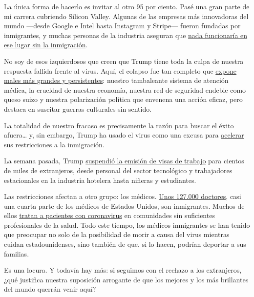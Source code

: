 La única forma de hacerlo es invitar al otro 95 por ciento. Pasé una
gran parte de mi carrera cubriendo Silicon Valley. Algunas de las
empresas más innovadoras del mundo ---desde Google e Intel hasta
Instagram y Stripe--- fueron fundadas por inmigrantes, y muchas personas
de la industria aseguran que
\href{https://www.nytimes.com/es/2017/02/23/espanol/por-que-silicon-valley-no-funcionaria-sin-inmigrantes.html}{nada
funcionaría en ese lugar sin la inmigración}.

No soy de esos izquierdosos que creen que Trump tiene toda la culpa de
nuestra respuesta fallida frente al virus. Aquí, el colapso fue tan
completo que
\href{https://www.theatlantic.com/magazine/archive/2020/06/underlying-conditions/610261/}{expone
males más grandes y persistentes}: nuestro tambaleante sistema de
atención médica, la crueldad de nuestra economía, nuestra red de
seguridad endeble como queso suizo y nuestra polarización política que
envenena una acción eficaz, pero destaca en suscitar guerras culturales
sin sentido.

La totalidad de nuestro fracaso es precisamente la razón para buscar el
éxito afuera\ldots{} y, sin embargo, Trump ha usado el virus como una
excusa para
\href{https://www.nytimes.com/2020/06/12/us/politics/coronavirus-trump-immigration-policies.html}{acelerar
sus restricciones a la inmigración}.

La semana pasada, Trump
\href{https://www.nytimes.com/2020/06/22/us/politics/trump-h1b-work-visas.html}{suspendió
la emisión de visas de trabajo} para cientos de miles de extranjeros,
desde personal del sector tecnológico y trabajadores estacionales en la
industria hotelera hasta niñeras y estudiantes.

Las restricciones afectan a otro grupo: los médicos.
\href{https://www.nbcnews.com/news/asian-america/fear-deportation-heightened-immigrant-doctors-h-1b-visas-amid-pandemic-n1204791}{Unos
127.000 doctores}, casi una cuarta parte de los médicos de Estados
Unidos, son inmigrantes. Muchos de ellos
\href{https://www.motherjones.com/coronavirus-updates/2020/06/immigrant-h1b-doctors-coronavirus-green-card/}{tratan
a pacientes con coronavirus} en comunidades sin suficientes
profesionales de la salud. Todo este tiempo, los médicos inmigrantes se
han tenido que preocupar no solo de la posibilidad de morir a causa del
virus mientras cuidan estadounidenses, sino también de que, si lo hacen,
podrían deportar a sus familias.

Es una locura. Y todavía hay más: si seguimos con el rechazo a los
extranjeros, ¿qué justifica nuestra suposición arrogante de que los
mejores y los más brillantes del mundo querrán venir aquí?

